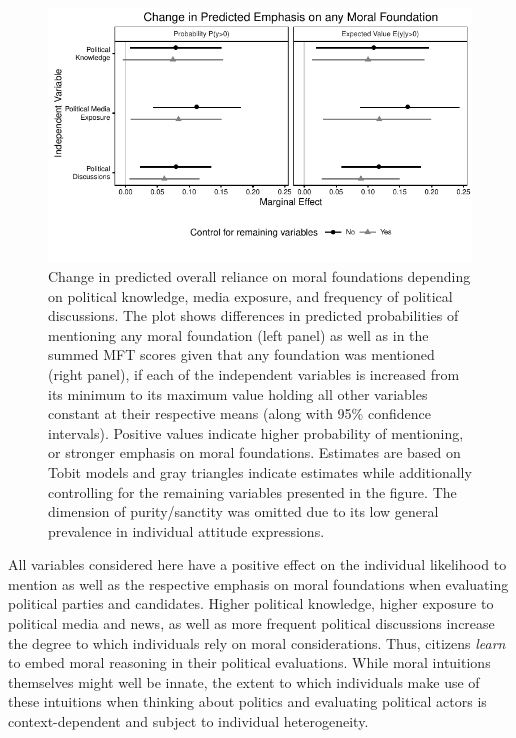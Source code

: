 \documentclass[12pt]{article}
\begin{document}
\begin{figure}[h]\centering
\includegraphics{../calc/fig/tobit_learn.pdf}
\caption{Change in predicted overall reliance on moral foundations depending on political knowledge, media exposure, and frequency of political discussions. The plot shows differences in predicted probabilities of mentioning any moral foundation (left panel) as well as in the summed MFT scores given that any foundation was mentioned (right panel), if each of the independent variables is increased from its minimum to its maximum value holding all other variables constant at their respective means (along with 95\% confidence intervals). Positive values indicate higher probability of mentioning, or stronger emphasis on moral foundations. Estimates are based on Tobit models and gray triangles indicate estimates while additionally controlling for the remaining variables presented in the figure. The dimension of purity/sanctity was omitted due to its low general prevalence in individual attitude expressions. %
}\label{fig:tobit_learn}
\end{figure}

All variables considered here have a positive effect on the individual likelihood to mention as well as the respective emphasis on moral foundations when evaluating political parties and candidates. Higher political knowledge, higher exposure to political media and news, as well as more frequent political discussions increase the degree to which individuals rely on moral considerations. Thus, citizens \textit{learn} to embed moral reasoning in their political evaluations. While moral intuitions themselves might well be innate, the extent to which individuals make use of these intuitions when thinking about politics and evaluating political actors is context-dependent and subject to individual heterogeneity.
\end{document}
